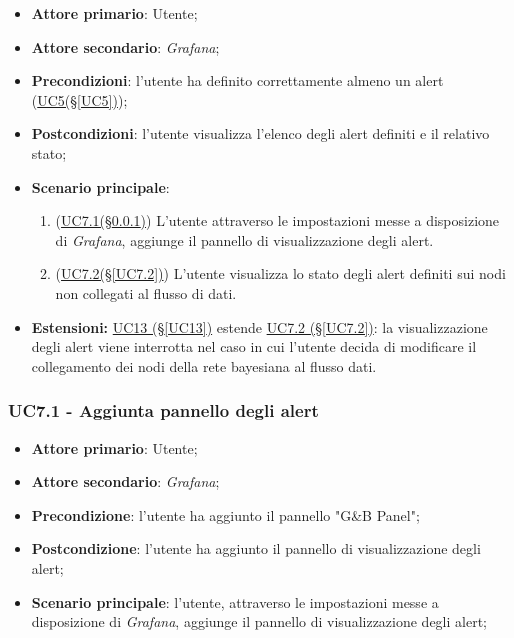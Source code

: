 \begin{itemize}
	\item \textbf{Attore primario}: Utente;
	\item \textbf{Attore secondario}: \textit{Grafana};
	\item \textbf{Precondizioni}: l'utente ha definito correttamente almeno un alert (\hyperref[UC5]{UC5(§\ref*{UC5})});
	\item \textbf{Postcondizioni}: l'utente visualizza l'elenco degli alert definiti e il relativo stato;
	\item \textbf{Scenario principale}:
	\begin{enumerate}
		\item (\hyperref[UC7.1]{UC7.1(§\ref*{UC7.1})}) L'utente attraverso le impostazioni messe a disposizione di \textit{Grafana}, aggiunge il pannello di visualizzazione degli alert.
		\item (\hyperref[UC7.2]{UC7.2(§\ref*{UC7.2})}) L'utente visualizza lo stato degli alert definiti sui nodi non collegati al flusso di dati.
	\end{enumerate}
	\item \textbf{Estensioni:} \hyperref[UC13]{UC13 (§\ref*{UC13})} estende \hyperref[UC7.2]{UC7.2 (§\ref*{UC7.2})}: la visualizzazione degli alert viene interrotta nel caso in cui l'utente decida di modificare il collegamento dei nodi della rete bayesiana al flusso dati.
\end{itemize}

\newpage

\subsubsection{UC7.1 - Aggiunta pannello degli alert }\label{UC7.1}
\begin{itemize}
	\item \textbf{Attore primario}: Utente;
	\item \textbf{Attore secondario}: \textit{Grafana};
	\item \textbf{Precondizione}: l'utente ha aggiunto il pannello "G\&B Panel";
	\item \textbf{Postcondizione}: l'utente ha aggiunto il pannello di visualizzazione degli alert;
	\item \textbf{Scenario principale}: l'utente, attraverso le impostazioni messe a disposizione di \textit{Grafana}, aggiunge il pannello di visualizzazione degli alert;
\end{itemize}

